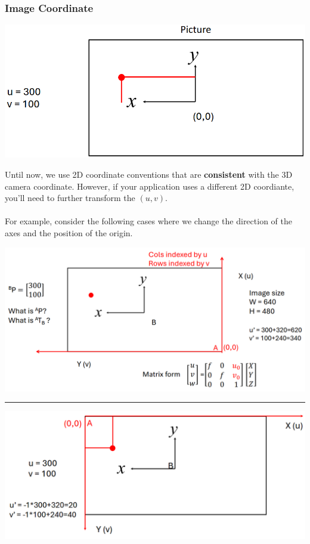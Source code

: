 \documentclass[10pt]{article}
\begin{document}
\subsubsection*{Image Coordinate}
\begin{center} 
	\includegraphics*[width=\textwidth]{L1_19.png} 
\end{center}
Until now, we use 2D coordinate conventions that are \textbf{consistent} with the 3D camera coordinate.  However, if your application uses a different 2D coordiante, you'll need to further transform the $(u, v)$.\\\\
For example, consider the following cases where we change the direction of the axes and the position of the origin.
\begin{center} 
	\includegraphics*[width=\textwidth]{L1_20.png} \\
    \rule{\textwidth}{1pt}
    \vspace{1cm}
    \includegraphics*[width=\textwidth]{L1_21.png}
\end{center}
\end{document}
